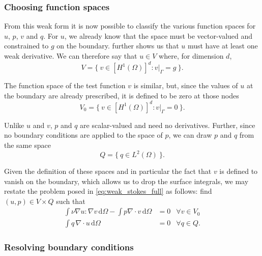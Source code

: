 \documentclass[thesis]{subfiles}
\begin{document}
\subsubsection{Choosing function spaces}

From this weak form it is now possible to classify the various function spaces for $u$, $p$, $v$ and $q$.
For $u$, we already know that the space must be vector-valued and constrained to $g$ on the boundary.
 further shows us that $u$ must have at least one weak derivative.
We can therefore say that $u \in V$ where, for dimension $d$,
\begin{equation}
  V = \{ \ v \in [H^1(\Omega)]^d : v |_{\Gamma} = g \ \}.
  \label{eq:stokes_velocity_space}
\end{equation}

The function space of the test function $v$ is similar, but, since the values of $u$ at the boundary are already prescribed, it is defined to be zero at those nodes
\begin{equation} \label{eq:vspace}
  V_0 = \{\ v \in [H^1(\Omega)]^d : v|_{\Gamma} = 0 \ \}.
\end{equation}

Unlike $u$ and $v$, $p$ and $q$ are scalar-valued and need no derivatives.
Further, since no boundary conditions are applied to the space of $p$, we can draw $p$ and $q$ from the same space
\begin{equation}
  Q = \{ \ q \in L^2(\Omega) \ \}.
  \label{eq:stokes_pressure_space}
\end{equation}

Given the definition of these spaces and in particular the fact that $v$ is defined to vanish on the boundary, which allows us to drop the surface integrals, we may restate the problem posed in \cref{eq:weak_stokes_full} as follows: find $(u, p) \in V \times Q$ such that
\begin{equation} \label{eq:weak_stokes_no_surface_terms}
  \begin{aligned}
    \int \nu \nabla u : \nabla v \, \textrm{d}\Omega
    - \int p \nabla \cdot v \, \textrm{d}\Omega
    &= 0
    &\forall v \in V_0 \\
    \int q \, \nabla \cdot u \, \textrm{d}\Omega
    &= 0
    &\forall q \in Q.
  \end{aligned}
\end{equation}

\subsubsection{Resolving boundary conditions}
\end{document}
